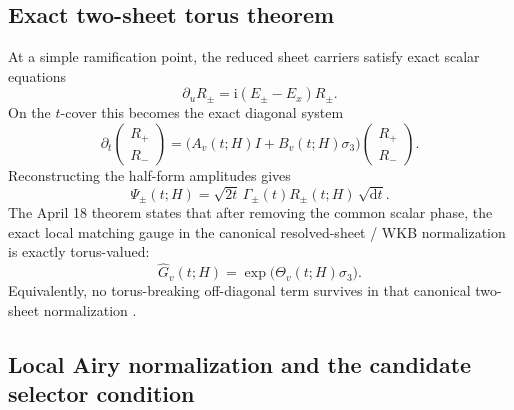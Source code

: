 \documentclass[11pt]{article}
\numberwithin{equation}{section}
\theoremstyle{definition}
\newcommand{\ii}{\mathrm i}
\newcommand{\dd}{\mathrm d}
\newcommand{\sigmaPauli}{\sigma_3}
\begin{document}
\subsection{Exact two-sheet torus theorem}

At a simple ramification point, the reduced sheet carriers satisfy exact scalar equations
\begin{equation}
\label{eq:Rpm-u}
 \partial_u R_\pm=\ii(E_\pm-E_x)R_\pm.
\end{equation}
On the $t$-cover this becomes the exact diagonal system
\begin{equation}
\label{eq:Rpm-t}
 \partial_t
 \begin{pmatrix}R_+\\ R_-\end{pmatrix}
 =\bigl(A_v(t;H)I+B_v(t;H)\sigmaPauli\bigr)
 \begin{pmatrix}R_+\\ R_-\end{pmatrix}.
\end{equation}
Reconstructing the half-form amplitudes gives
\begin{equation}
\label{eq:Psi-pm}
 \Psi_\pm(t;H)=\sqrt{2t}\,\Gamma_\pm(t)R_\pm(t;H)\,\sqrt{\dd t}.
\end{equation}
The April 18 theorem states that after removing the common scalar phase, the exact local matching gauge in the canonical resolved-sheet / WKB normalization is exactly torus-valued:
\begin{equation}
\label{eq:torus-theorem}
 \widehat G_v(t;H)=\exp\!\bigl(\Theta_v(t;H)\sigmaPauli\bigr).
\end{equation}
Equivalently, no torus-breaking off-diagonal term survives in that canonical two-sheet normalization \cite{MainApril18,SuppApril18}.

\subsection{Local Airy normalization and the candidate selector condition}
\end{document}
